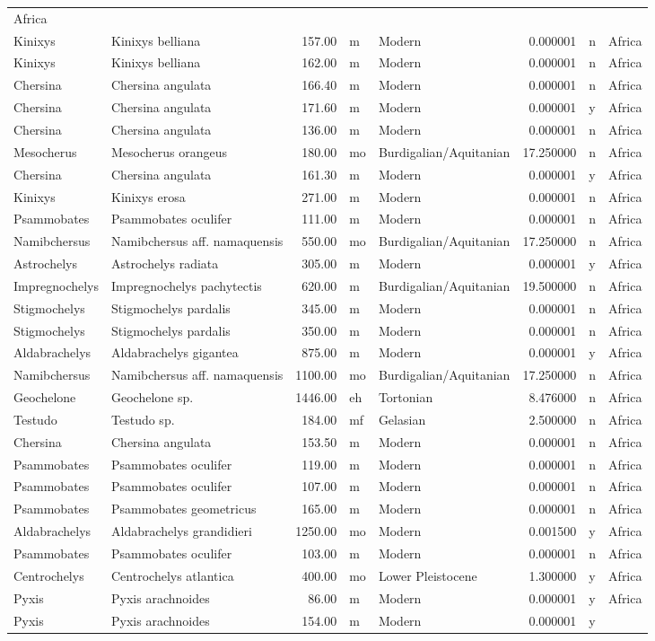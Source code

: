 \documentclass[]{article}
\begin{document}
\begin{longtable}[]{@{}llrllrll@{}}
Africa\tabularnewline
Kinixys & Kinixys belliana & 157.00 & m & Modern & 0.000001 & n &
Africa\tabularnewline
Kinixys & Kinixys belliana & 162.00 & m & Modern & 0.000001 & n &
Africa\tabularnewline
Chersina & Chersina angulata & 166.40 & m & Modern & 0.000001 & n &
Africa\tabularnewline
Chersina & Chersina angulata & 171.60 & m & Modern & 0.000001 & y &
Africa\tabularnewline
Chersina & Chersina angulata & 136.00 & m & Modern & 0.000001 & n &
Africa\tabularnewline
Mesocherus & Mesocherus orangeus & 180.00 & mo & Burdigalian/Aquitanian
& 17.250000 & n & Africa\tabularnewline
Chersina & Chersina angulata & 161.30 & m & Modern & 0.000001 & y &
Africa\tabularnewline
Kinixys & Kinixys erosa & 271.00 & m & Modern & 0.000001 & n &
Africa\tabularnewline
Psammobates & Psammobates oculifer & 111.00 & m & Modern & 0.000001 & n
& Africa\tabularnewline
Namibchersus & Namibchersus aff. namaquensis & 550.00 & mo &
Burdigalian/Aquitanian & 17.250000 & n & Africa\tabularnewline
Astrochelys & Astrochelys radiata & 305.00 & m & Modern & 0.000001 & y &
Africa\tabularnewline
Impregnochelys & Impregnochelys pachytectis & 620.00 & m &
Burdigalian/Aquitanian & 19.500000 & n & Africa\tabularnewline
Stigmochelys & Stigmochelys pardalis & 345.00 & m & Modern & 0.000001 &
n & Africa\tabularnewline
Stigmochelys & Stigmochelys pardalis & 350.00 & m & Modern & 0.000001 &
n & Africa\tabularnewline
Aldabrachelys & Aldabrachelys gigantea & 875.00 & m & Modern & 0.000001
& y & Africa\tabularnewline
Namibchersus & Namibchersus aff. namaquensis & 1100.00 & mo &
Burdigalian/Aquitanian & 17.250000 & n & Africa\tabularnewline
Geochelone & Geochelone sp. & 1446.00 & eh & Tortonian & 8.476000 & n &
Africa\tabularnewline
Testudo & Testudo sp. & 184.00 & mf & Gelasian & 2.500000 & n &
Africa\tabularnewline
Chersina & Chersina angulata & 153.50 & m & Modern & 0.000001 & n &
Africa\tabularnewline
Psammobates & Psammobates oculifer & 119.00 & m & Modern & 0.000001 & n
& Africa\tabularnewline
Psammobates & Psammobates oculifer & 107.00 & m & Modern & 0.000001 & n
& Africa\tabularnewline
Psammobates & Psammobates geometricus & 165.00 & m & Modern & 0.000001 &
n & Africa\tabularnewline
Aldabrachelys & Aldabrachelys grandidieri & 1250.00 & mo & Modern &
0.001500 & y & Africa\tabularnewline
Psammobates & Psammobates oculifer & 103.00 & m & Modern & 0.000001 & n
& Africa\tabularnewline
Centrochelys & Centrochelys atlantica & 400.00 & mo & Lower Pleistocene
& 1.300000 & y & Africa\tabularnewline
Pyxis & Pyxis arachnoides & 86.00 & m & Modern & 0.000001 & y &
Africa\tabularnewline
Pyxis & Pyxis arachnoides & 154.00 & m & Modern & 0.000001 & y &

\end{longtable}
\end{document}
